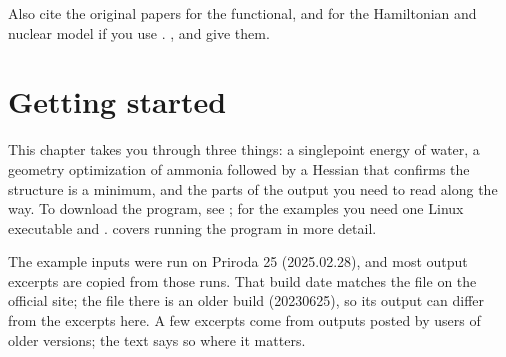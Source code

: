 \documentclass[letterpaper,10pt,english,openany,oneside]{sphinxmanual}
\begin{document}
\sphinxAtStartPar
Also cite the original papers for the functional, and for the Hamiltonian and nuclear model if you use .
{\hyperref[\detokenize{reference/dft:dft-functional}]{}}, {\hyperref[\detokenize{reference/control:control-four}]{}} and
{\hyperref[\detokenize{reference/control:control-nucleus}]{}} give them.

\sphinxstepscope


\chapter{Getting started}
\label{\detokenize{start/getting-started:getting-started}}\label{\detokenize{start/getting-started:start-getting-started}}\label{\detokenize{start/getting-started::doc}}
\sphinxAtStartPar
This chapter takes you through three things: a single\sphinxhyphen{}point energy of water, a geometry optimization of ammonia
followed by a Hessian that confirms the structure is a minimum, and the parts of the output you need to read along
the way. To download the program, see {\hyperref[\detokenize{start/running:obtaining-priroda}]{}}; for the examples you need one Linux executable and
. {\hyperref[\detokenize{start/running::doc}]{}} covers running the program in more detail.

\sphinxAtStartPar
The example inputs were run on Priroda 25 (2025.02.28), and most output excerpts are copied from those runs. That
build date matches the file  on the official site; the file  there is an older build (2023\sphinxhyphen{}06\sphinxhyphen{}25), so its
output can differ from the excerpts here. A few excerpts come from outputs posted by users of older versions; the
text says so where it matters.
\end{document}
